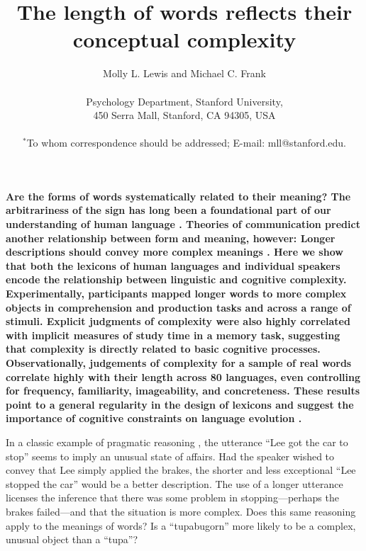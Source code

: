 \documentclass[12pt]{article}
\title{The length of words reflects their conceptual complexity}
\author
{Molly L. Lewis and Michael C. Frank\\
\\
\normalsize{Psychology Department, Stanford University,}\\
\normalsize{450 Serra Mall, Stanford, CA 94305, USA}\\
\\
\normalsize{$^\ast$To whom correspondence should be addressed; E-mail: mll@stanford.edu.}
}
\date{}
\newenvironment{sciabstract}{%
\begin{quote} \bf}
{\end{quote}}
\begin{document}
 

\baselineskip24pt

\maketitle 




{\bf Are the forms of words systematically related to their meaning? The arbitrariness of the sign has long been a foundational part of our understanding of human language \cite{saussure,hockett1960}. Theories of communication predict another relationship between form and meaning, however: Longer descriptions should convey more complex meanings \cite{horn1984,jaeger2006}. Here we show that both the lexicons of human languages and individual speakers encode the relationship between linguistic and cognitive complexity. Experimentally, participants mapped longer words to more complex objects in comprehension and production tasks and across a range of stimuli. Explicit judgments of complexity were also highly correlated with implicit measures of study time in a memory task, suggesting that complexity is directly related to basic cognitive processes. Observationally, judgements of complexity for a sample of real words correlate highly with their length across 80 languages, even controlling for frequency, familiarity, imageability, and concreteness. These results point to a general regularity in the design of lexicons and suggest the importance of cognitive constraints on language evolution \cite{christiansen2008,lieberman2007}.}


In a classic example of pragmatic reasoning \cite{horn1984}, the utterance ``Lee got the car to stop'' seems to imply an unusual state of affairs. Had the speaker wished to convey that Lee simply applied the brakes, the shorter and less exceptional ``Lee stopped the car'' would be a better description. The use of a longer utterance licenses the inference that there was some problem in stopping---perhaps the brakes failed---and that the situation is more complex. Does this same reasoning apply to the meanings of words? Is a ``tupabugorn'' more likely to be a complex, unusual object than a ``tupa''? 
\end{document}
